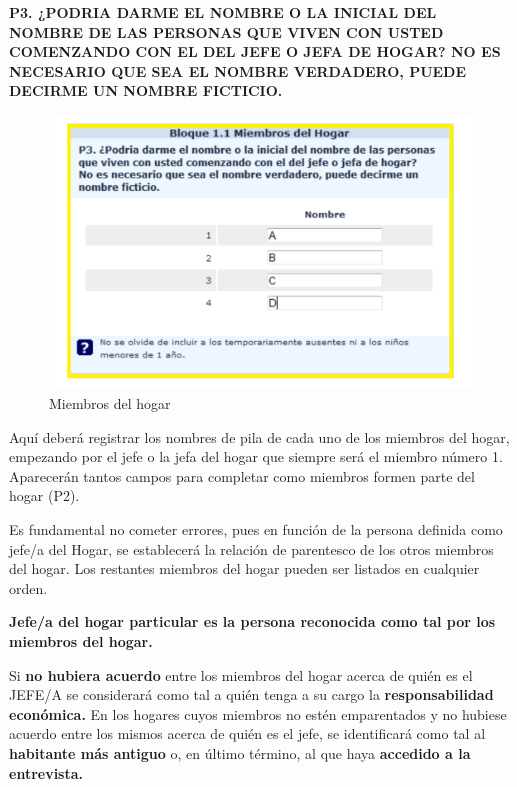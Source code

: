 \documentclass[
  openany]{book}
\begin{document}
\textbf{P3. ¿PODRIA DARME EL NOMBRE O LA INICIAL DEL NOMBRE DE LAS PERSONAS QUE VIVEN CON USTED COMENZANDO CON EL DEL JEFE O JEFA DE HOGAR? NO ES NECESARIO QUE SEA EL NOMBRE VERDADERO, PUEDE DECIRME UN NOMBRE FICTICIO.}

\begin{figure}

{\centering \includegraphics[width=1\linewidth]{imagenes/figura6-48} 

}

\caption{Miembros del hogar}\label{fig:Localcom57}
\end{figure}

Aquí deberá registrar los nombres de pila de cada uno de los miembros del hogar, empezando por el jefe o la jefa del hogar que siempre será el miembro número 1. Aparecerán tantos campos para completar como miembros formen parte del hogar (P2).

Es fundamental no cometer errores, pues en función de la persona definida como jefe/a del Hogar, se establecerá la relación de parentesco de los otros miembros del hogar. Los restantes miembros del hogar pueden ser listados en cualquier orden.

\textbf{Jefe/a del hogar particular es la persona reconocida como tal por los miembros del hogar.}

Si \textbf{no hubiera acuerdo} entre los miembros del hogar acerca de quién es el JEFE/A se considerará como tal a quién tenga a su cargo la \textbf{responsabilidad económica.} En los hogares cuyos miembros no estén emparentados y no hubiese acuerdo entre los mismos acerca de quién es el jefe, se identificará como tal al \textbf{habitante más antiguo} o, en último término, al que haya \textbf{accedido a la entrevista.}
\end{document}
